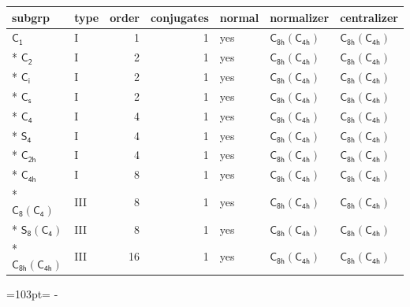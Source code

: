 \documentclass[10pt,a4paper]{article}
\newcommand{\needspace}[1]{\par\penalty-100\begingroup\dimen0=#1\relax\dimen2=\pagegoal
  \advance\dimen2-\pagetotal\ifdim\dimen0>\dimen2\relax\ifdim\dimen2>0pt\vfil\break\fi\fi
  \endgroup}
\numberwithin{equation}{section}
\newcommand{\grp}[1]{\mathsf{#1}}
\begin{document}
{\small\begin{longtable}{@{}llrrlll@{}}\toprule
subgrp & type & order & conjugates & normal & normalizer & centralizer\\\midrule\endhead
\bottomrule\endfoot\endlastfoot
\href{../../../rotation/data/pdf/C1.pdf}{$\grp{C_{1}}$} & I & 1 & 1 & yes & \href{C8h-C4h.pdf}{$\grp{C_{8h}}(\grp{C_{4h}})$} & \href{C8h-C4h.pdf}{$\grp{C_{8h}}(\grp{C_{4h}})$}\\*
\href{../../../rotation/data/pdf/C2.pdf}{$\grp{C_{2}}$} & I & 2 & 1 & yes & \href{C8h-C4h.pdf}{$\grp{C_{8h}}(\grp{C_{4h}})$} & \href{C8h-C4h.pdf}{$\grp{C_{8h}}(\grp{C_{4h}})$}\\*
\href{../../../rotation/data/pdf/S2.pdf}{$\grp{C_{i}}$} & I & 2 & 1 & yes & \href{C8h-C4h.pdf}{$\grp{C_{8h}}(\grp{C_{4h}})$} & \href{C8h-C4h.pdf}{$\grp{C_{8h}}(\grp{C_{4h}})$}\\*
\href{../../../rotation/data/pdf/C1v.pdf}{$\grp{C_{s}}$} & I & 2 & 1 & yes & \href{C8h-C4h.pdf}{$\grp{C_{8h}}(\grp{C_{4h}})$} & \href{C8h-C4h.pdf}{$\grp{C_{8h}}(\grp{C_{4h}})$}\\*
\href{../../../rotation/data/pdf/C4.pdf}{$\grp{C_{4}}$} & I & 4 & 1 & yes & \href{C8h-C4h.pdf}{$\grp{C_{8h}}(\grp{C_{4h}})$} & \href{C8h-C4h.pdf}{$\grp{C_{8h}}(\grp{C_{4h}})$}\\*
\href{../../../rotation/data/pdf/S4.pdf}{$\grp{S_{4}}$} & I & 4 & 1 & yes & \href{C8h-C4h.pdf}{$\grp{C_{8h}}(\grp{C_{4h}})$} & \href{C8h-C4h.pdf}{$\grp{C_{8h}}(\grp{C_{4h}})$}\\*
\href{../../../rotation/data/pdf/C2h.pdf}{$\grp{C_{2h}}$} & I & 4 & 1 & yes & \href{C8h-C4h.pdf}{$\grp{C_{8h}}(\grp{C_{4h}})$} & \href{C8h-C4h.pdf}{$\grp{C_{8h}}(\grp{C_{4h}})$}\\*
\href{../../../rotation/data/pdf/C4h.pdf}{$\grp{C_{4h}}$} & I & 8 & 1 & yes & \href{C8h-C4h.pdf}{$\grp{C_{8h}}(\grp{C_{4h}})$} & \href{C8h-C4h.pdf}{$\grp{C_{8h}}(\grp{C_{4h}})$}\\*
\href{C8-C4.pdf}{$\grp{C_{8}}(\grp{C_{4}})$} & III & 8 & 1 & yes & \href{C8h-C4h.pdf}{$\grp{C_{8h}}(\grp{C_{4h}})$} & \href{C8h-C4h.pdf}{$\grp{C_{8h}}(\grp{C_{4h}})$}\\*
\href{S8-C4.pdf}{$\grp{S_{8}}(\grp{C_{4}})$} & III & 8 & 1 & yes & \href{C8h-C4h.pdf}{$\grp{C_{8h}}(\grp{C_{4h}})$} & \href{C8h-C4h.pdf}{$\grp{C_{8h}}(\grp{C_{4h}})$}\\*
\href{C8h-C4h.pdf}{$\grp{C_{8h}}(\grp{C_{4h}})$} & III & 16 & 1 & yes & \href{C8h-C4h.pdf}{$\grp{C_{8h}}(\grp{C_{4h}})$} & \href{C8h-C4h.pdf}{$\grp{C_{8h}}(\grp{C_{4h}})$}\\
\bottomrule\end{longtable}}
\needspace{103pt}
\end{document}
